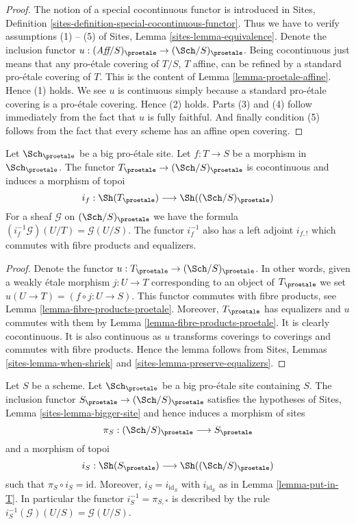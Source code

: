 \begin{proof}
The notion of a special cocontinuous functor is introduced in
Sites, Definition \ref{sites-definition-special-cocontinuous-functor}.
Thus we have to verify assumptions (1) -- (5) of
Sites, Lemma \ref{sites-lemma-equivalence}.
Denote the inclusion functor
$u : (\textit{Aff}/S)_\proetale \to (\Sch/S)_\proetale$.
Being cocontinuous just means that any pro-\'etale covering of
$T/S$, $T$ affine, can be refined by a standard pro-\'etale
covering of $T$. This is the content of
Lemma \ref{lemma-proetale-affine}.
Hence (1) holds. We see $u$ is continuous simply because a standard
pro-\'etale covering is a pro-\'etale covering. Hence (2) holds.
Parts (3) and (4) follow immediately from the fact that $u$ is
fully faithful. And finally condition (5) follows from the
fact that every scheme has an affine open covering.
\end{proof}

\begin{lemma}
\label{lemma-put-in-T}
Let $\Sch_\proetale$ be a big pro-\'etale site.
Let $f : T \to S$ be a morphism in $\Sch_\proetale$.
The functor $T_\proetale \to (\Sch/S)_\proetale$
is cocontinuous and induces a morphism of topoi
$$
i_f :
\Sh(T_\proetale)
\longrightarrow
\Sh((\Sch/S)_\proetale)
$$
For a sheaf $\mathcal{G}$ on $(\Sch/S)_\proetale$
we have the formula $(i_f^{-1}\mathcal{G})(U/T) = \mathcal{G}(U/S)$.
The functor $i_f^{-1}$ also has a left adjoint $i_{f, !}$ which commutes
with fibre products and equalizers.
\end{lemma}

\begin{proof}
Denote the functor $u : T_\proetale \to (\Sch/S)_\proetale$.
In other words, given a weakly \'etale morphism $j : U \to T$ corresponding
to an object of $T_\proetale$ we set $u(U \to T) = (f \circ j : U \to S)$.
This functor commutes with fibre products, see
Lemma \ref{lemma-fibre-products-proetale}.
Moreover, $T_\proetale$ has equalizers and $u$ commutes with them
by Lemma \ref{lemma-fibre-products-proetale}.
It is clearly cocontinuous.
It is also continuous as $u$ transforms coverings to coverings and
commutes with fibre products. Hence the lemma follows from
Sites, Lemmas \ref{sites-lemma-when-shriek}
and \ref{sites-lemma-preserve-equalizers}.
\end{proof}

\begin{lemma}
\label{lemma-at-the-bottom}
Let $S$ be a scheme. Let $\Sch_\proetale$ be a big pro-\'etale
site containing $S$.
The inclusion functor $S_\proetale \to (\Sch/S)_\proetale$
satisfies the hypotheses of Sites, Lemma \ref{sites-lemma-bigger-site}
and hence induces a morphism of sites
$$
\pi_S : (\Sch/S)_\proetale \longrightarrow S_\proetale
$$
and a morphism of topoi
$$
i_S : \Sh(S_\proetale) \longrightarrow \Sh((\Sch/S)_\proetale)
$$
such that $\pi_S \circ i_S = \text{id}$. Moreover, $i_S = i_{\text{id}_S}$
with $i_{\text{id}_S}$ as in Lemma \ref{lemma-put-in-T}. In particular the
functor $i_S^{-1} = \pi_{S, *}$ is described by the rule
$i_S^{-1}(\mathcal{G})(U/S) = \mathcal{G}(U/S)$.
\end{lemma}

